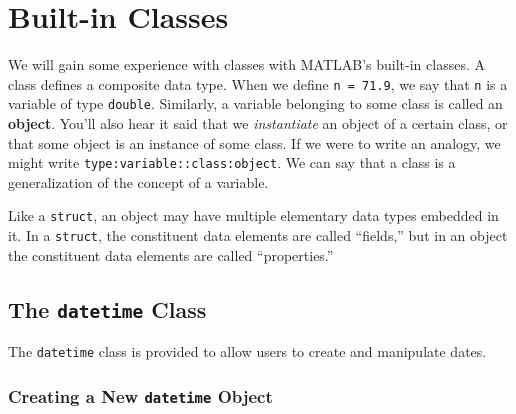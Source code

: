 
\section{Built-in Classes}

We will gain some experience with classes with MATLAB's built-in classes. A class defines a composite data type. When we define \texttt{n = 71.9}, we say that \texttt{n} is a variable of type \texttt{double}. Similarly, a variable belonging to some class is called an \textbf{object}. You'll also hear it said that we \textit{instantiate} an object of a certain class, or that some object is an instance of some class.  If we were to write an analogy, we might write \texttt{type:variable::class:object}. We can say that a class is a generalization of the concept of a variable.

Like a \texttt{struct}, an object may have multiple elementary data types embedded in it. In a \texttt{struct}, the constituent data elements are called ``fields,'' but in an object the constituent data elements are called ``properties.''

\subsection{The \texttt{datetime} Class}
The \texttt{datetime} class is provided to allow users to create and manipulate dates.

\subsubsection{Creating a New \texttt{datetime} Object}

